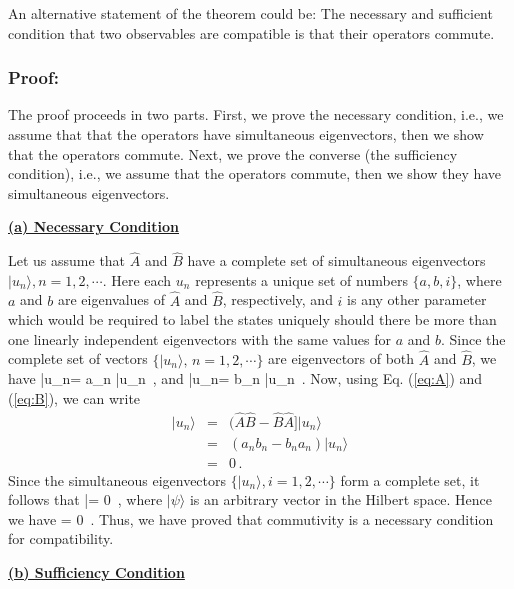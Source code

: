 \noindent An alternative statement of the theorem could be: The necessary and sufficient condition that two observables are compatible is that their operators commute.

\subsubsection{Proof:}
The proof proceeds in two parts. First, we prove the necessary condition, i.e., we assume that that the operators have simultaneous eigenvectors, then we show that the operators commute. Next, we prove the converse (the sufficiency condition), i.e., we assume that
the operators commute, then we show they have simultaneous eigenvectors.

\vspace{3 mm}
\noindent
{\bf {\underline {(a) Necessary Condition}}}

Let us assume that $\hat{A}$ and $\hat{B}$ have a complete set of simultaneous eigenvectors $|u_n\rangle, n =1,2, \cdots$. Here each $u_n$ represents a unique set of numbers $\{a,b,i\}$, where $a$ and $b$ are eigenvalues of $\hat{A}$ and $\hat{B}$, respectively, and $i$ is any other parameter which would be required to label the states uniquely should there be more than one linearly independent eigenvectors with the same values for $a$ and $b$. Since the complete set of vectors $\{|u_n\rangle,\, n= 1,2, \cdots\}$ are eigenvectors of both
$\hat{A}$ and $\hat{B}$, we have
\be
{}|u_n\rangle = a_n |u_n\rangle\, ,
\label{eq:A}
\ee
and
\be
{}|u_n\rangle = b_n |u_n\rangle\, .
\label{eq:B}
\ee
Now, using Eq. (\ref{eq:A}) and (\ref{eq:B}), we can write
\begin{eqnarray}
[\hat{A},\hat{B}]|u_n\rangle &= & (\hat{A}\hat{B}-\hat{B}\hat{A}]|u_n\rangle \nonumber \\
                             &=& (a_nb_n-b_na_n)|u_n\rangle \nonumber \\
														 & = & 0\,.
\end{eqnarray}
Since the simultaneous eigenvectors $\{|u_n\rangle, i= 1,2, \cdots\}$ form a complete set, it follows that
|\psi\rangle = 0\, ,
\ee
where $|\psi\rangle$ is an arbitrary vector in the Hilbert space. Hence we have
 = 0\, .
\ee
Thus, we have proved that commutivity is a necessary condition for compatibility.


\vspace{3 mm}

\noindent
{\bf {\underline {(b) Sufficiency Condition}}}

